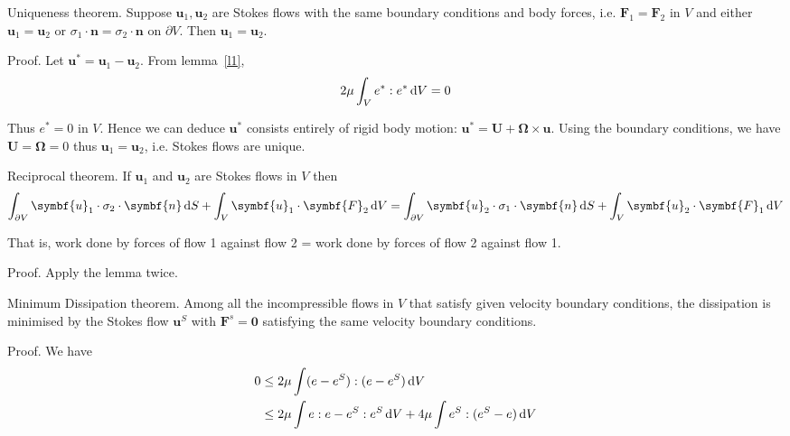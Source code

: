 \documentclass{jknotes}
\begin{document}
\begin{theorem}
	Uniqueness theorem. Suppose $\symbf{u}_1, \symbf{u}_2$ are Stokes flows with the
	same boundary conditions and body forces, i.e. $\symbf{F}_1 = \symbf{F}_2$ in
	$V$ and either $\symbf{u}_1 = \symbf{u}_2$ or $\sigma_1 \cdot \symbf{n} = \sigma_2
	\cdot \symbf{n}$ on $\partial V$. Then $\symbf{u}_1 = \symbf{u}_2$.
\end{theorem}

Proof. Let $\symbf{u}^* = \symbf{u}_1 - \symbf{u}_2$. From lemma~\ref{l1}, 
\begin{equation}
	2\mu \int_V e^* : e^* \, \diffd V = 0
\end{equation}

Thus $e^* = 0$ in $V$. Hence we can deduce $\symbf{u}^*$ consists entirely of
rigid body motion: $\symbf{u}^* = \symbf{U} + \symbf{\Omega} \times \symbf{u}$. Using the
boundary conditions, we have $\symbf{U} = \symbf{\Omega} = 0$ thus $\symbf{u}_1 =
\symbf{u}_2$, i.e. Stokes flows are unique.

\begin{theorem}
	Reciprocal theorem. If $\symbf{u}_1$ and $\symbf{u}_2$ are Stokes flows in $V$
	then
	\begin{equation}
		\int_{\partial V} \symbf{u}_1 \cdot \sigma_2 \cdot \symbf{n} \, \diffd S +
		\int_V \symbf{u}_1 \cdot \symbf{F}_2 \, \diffd V = 
		\int_{\partial V} \symbf{u}_2 \cdot \sigma_1 \cdot \symbf{n} \, \diffd S +
		\int_V \symbf{u}_2 \cdot \symbf{F}_1 \, \diffd V
	\end{equation}

	That is, work done by forces of flow 1 against flow 2 = work done by
	forces of flow 2 against flow 1.
\end{theorem}

Proof. Apply the lemma twice.

\begin{theorem}
	Minimum Dissipation theorem. Among all the incompressible flows in $V$
	that satisfy given velocity boundary conditions, the dissipation is
	minimised by the Stokes flow $\symbf{u}^S$ with $\symbf{F}^s = \symbf{0}$
	satisfying the same velocity boundary conditions.
\end{theorem}

Proof. We have
\begin{equation}
	\begin{aligned}
		0 &\le 2\mu \int (e - e^S):(e-e^S) \, \diffd V \\
		  &\le 2\mu \int e:e - e^S:e^S \, \diffd V + 4\mu \int e^S : (e^S
		-e)\,\diffd V
	\end{aligned}
\end{equation}
\end{document}
